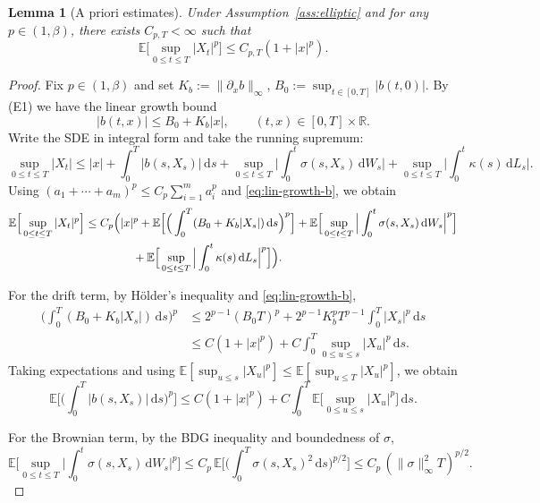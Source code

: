 \documentclass[11pt]{article}
\newcommand{\R}{\mathbb{R}}
\newcommand{\E}{\mathbb{E}}
\newcommand{\1}{\mathbf{1}}
\newcommand{\dd}{\mathrm{d}}
\theoremstyle{plain}
\newtheorem{lemma}[theorem]{Lemma}
\theoremstyle{definition}
\theoremstyle{remark}
\begin{document}
\begin{lemma}[A priori estimates]\label{lem:apriori}
Under Assumption~\ref{ass:elliptic} and for any $p\in(1,\beta)$, there exists $C_{p,T}<\infty$ such that
\[
\E\Big[\sup_{0\le t\le T}|X_t|^p\Big]\le C_{p,T}(1+|x|^p).
\]
\end{lemma}

\begin{proof}
Fix $p\in(1,\beta)$ and set $K_b:=\|\partial_x b\|_\infty$, $B_0:=\sup_{t\in[0,T]}|b(t,0)|$.
By (E1) we have the linear growth bound
\begin{equation}\label{eq:lin-growth-b}
|b(t,x)|\le B_0+K_b|x|,\qquad (t,x)\in[0,T]\times\R.
\end{equation}
Write the SDE in integral form and take the running supremum:
\[
\sup_{0\le t\le T}|X_t|
\le |x|+\int_0^T |b(s,X_s)|\,\dd s+\sup_{0\le t\le T}\Big|\int_0^t \sigma(s,X_s)\,\dd W_s\Big|
+\sup_{0\le t\le T}\Big|\int_0^t \kappa(s)\,\dd L_s\Big|.
\]
Using $(a_1+\cdots+a_m)^p\le C_p\sum_{i=1}^m a_i^p$ and \eqref{eq:lin-growth-b}, we obtain
\begin{align*}
\E\Big[\sup_{0\le t\le T}|X_t|^p\Big]
&\le C_{p}\Big(
|x|^p + \E\Big[\Big(\int_0^T (B_0+K_b|X_s|)\,\dd s\Big)^p\Big]
+ \E\Big[\sup_{0\le t\le T}\Big|\int_0^t \sigma(s,X_s)\,\dd W_s\Big|^p\Big]\\
&\hspace{4.2em}
+ \E\Big[\sup_{0\le t\le T}\Big|\int_0^t \kappa(s)\,\dd L_s\Big|^p\Big]\Big).
\end{align*}

\medskip
\noindent For the drift term, by H\"older's inequality and \eqref{eq:lin-growth-b},
\[
\begin{aligned}
\Big(\int_0^T (B_0+K_b|X_s|)\,\dd s\Big)^p
&\le 2^{p-1}(B_0T)^p + 2^{p-1}K_b^pT^{p-1}\int_0^T |X_s|^p\,\dd s\\
&\le C(1+|x|^p)+C\int_0^T \sup_{0\le u\le s}|X_u|^p\,\dd s.
\end{aligned}
\]
Taking expectations and using $\E[\sup_{u\le s}|X_u|^p]\le \E[\sup_{u\le T}|X_u|^p]$, we obtain
\begin{equation}\label{eq:drift-bound}
\E\Big[\Big(\int_0^T |b(s,X_s)|\,\dd s\Big)^p\Big]
\le C(1+|x|^p)+C\int_0^T \E\Big[\sup_{0\le u\le s}|X_u|^p\Big]\,\dd s.
\end{equation}

\medskip
\noindent For the Brownian term, by the BDG inequality and boundedness of $\sigma$,
\begin{equation}\label{eq:bdg-brown}
\E\Big[\sup_{0\le t\le T}\Big|\int_0^t \sigma(s,X_s)\,\dd W_s\Big|^p\Big]
\le C_p\,\E\Big[\Big(\int_0^T \sigma(s,X_s)^2\,\dd s\Big)^{p/2}\Big]
\le C_p\,(\|\sigma\|_\infty^2T)^{p/2}.
\end{equation}


\end{proof}
\end{document}

